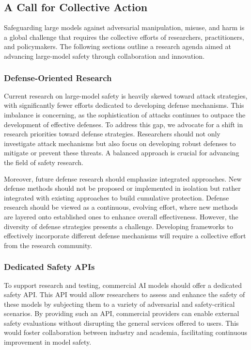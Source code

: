 \subsection{A Call for Collective Action}

Safeguarding large models against adversarial manipulation, misuse, and harm is a global challenge that requires the collective efforts of researchers, practitioners, and policymakers. The following sections outline a research agenda aimed at advancing large-model safety through collaboration and innovation.

\subsubsection{Defense-Oriented Research}

Current research on large-model safety is heavily skewed toward attack strategies, with significantly fewer efforts dedicated to developing defense mechanisms. This imbalance is concerning, as the sophistication of attacks continues to outpace the development of effective defenses. To address this gap, we advocate for a shift in research priorities toward defense strategies. Researchers should not only investigate attack mechanisms but also focus on developing robust defenses to mitigate or prevent these threats. A balanced approach is crucial for advancing the field of safety research.

Moreover, future defense research should emphasize integrated approaches. New defense methods should not be proposed or implemented in isolation but rather integrated with existing approaches to build cumulative protection. Defense research should be viewed as a continuous, evolving effort, where new methods are layered onto established ones to enhance overall effectiveness. However, the diversity of defense strategies presents a challenge. Developing frameworks to effectively incorporate different defense mechanisms will require a collective effort from the research community.

\subsubsection{Dedicated Safety APIs}

To support research and testing, commercial AI models should offer a dedicated safety API. This API would allow researchers to assess and enhance the safety of these models by subjecting them to a variety of adversarial and safety-critical scenarios. By providing such an API, commercial providers can enable external safety evaluations without disrupting the general services offered to users. This would foster collaboration between industry and academia, facilitating continuous improvement in model safety.

